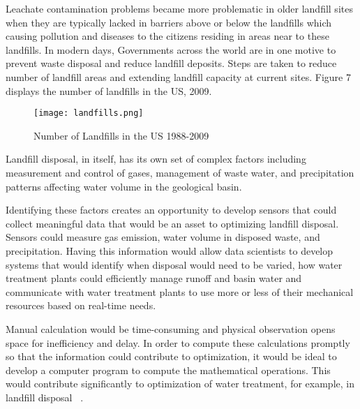 \documentclass[sigconf]{acmart}
\begin{document}
Leachate contamination problems became more problematic in older landfill sites when they are typically lacked in barriers above or below the landfills which causing pollution and diseases to the citizens residing in areas near to these landfills. In modern days, Governments across the world are in one motive to prevent waste disposal and reduce landfill deposits. Steps are taken to reduce number of landfill areas and extending landfill capacity at current sites. Figure 7 displays the number of landfills in the US, 2009.

\begin{figure}[ht!]
  \texttt{[image: landfills.png]}
  \caption{Number of Landfills in the US 1988-2009}
\end{figure}

Landfill disposal, in itself, has its own set of complex factors including measurement and control of gases, management of waste water, and precipitation patterns affecting water volume in the geological basin.  

Identifying these factors creates an opportunity to develop sensors that could collect meaningful data that would be an asset to optimizing landfill disposal.  Sensors could measure gas emission, water volume in disposed waste, and precipitation.  Having this information would allow data scientists to develop systems that would identify when disposal would need to be varied, how water treatment plants could efficiently manage runoff and basin water and communicate with water treatment plants to use more or less of their mechanical resources based on real-time needs. 

Manual calculation would be time-consuming and physical observation opens space for inefficiency and delay.  In order to compute these calculations promptly so that the information could contribute to optimization, it would be ideal to develop a computer program to compute the mathematical operations.  This would contribute significantly to optimization of water treatment, for example, in landfill disposal ~\cite{akbarpour2016}.
\end{document}
